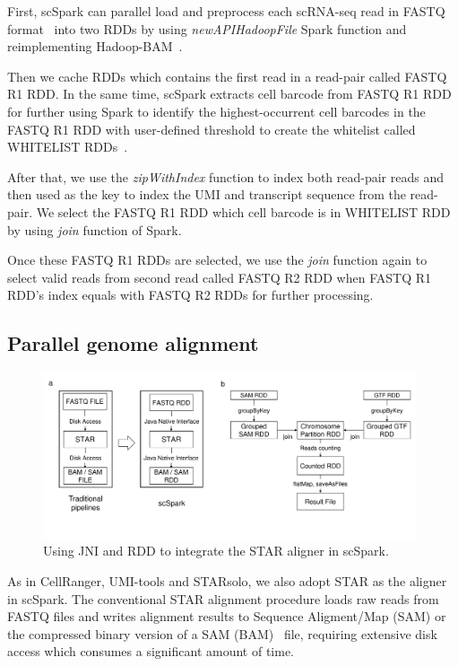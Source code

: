 \documentclass[conference]{IEEEtran}
\begin{document}
First, scSpark can parallel load and preprocess each scRNA-seq read in FASTQ format~\cite{cock2010sanger} into two RDDs by using \textit{newAPIHadoopFile} Spark function and reimplementing Hadoop-BAM~\cite{hadoopBAM}.

Then we cache RDDs which contains the first read in a read-pair called FASTQ R1 RDD.
In the same time, scSpark extracts cell barcode from FASTQ R1 RDD for further using Spark to identify the highest-occurrent cell barcodes in the FASTQ R1 RDD with user-defined threshold to create the whitelist called WHITELIST RDDs~\cite{guo2018bioinformatics}.

After that, we use the \textit{zipWithIndex} function to index both read-pair reads and then used as the key to index the UMI and transcript sequence from the read-pair.
We select the FASTQ R1 RDD which cell barcode is in WHITELIST RDD by using \textit{join} function of Spark.

Once these FASTQ R1 RDDs are selected, we use the \textit{join} function again to select valid reads from second read called FASTQ R2 RDD when FASTQ R1 RDD's index equals with FASTQ R2 RDDs for further processing. 

\subsection{Parallel genome alignment}
\begin{figure}
\centering
	\includegraphics[width=0.98\textwidth]{fig1.pdf}
	\caption{Using JNI and RDD to integrate the STAR aligner in scSpark.} \label{fig1}
\end{figure}

As in CellRanger, UMI-tools and STARsolo, we also adopt STAR as the aligner in scSpark.
The conventional STAR alignment procedure loads raw reads from FASTQ files and writes alignment results to Sequence Aligment/Map (SAM) or the compressed binary version of a SAM (BAM)~\cite{li2009sequence} file, requiring extensive disk access which consumes a significant amount of time.
\end{document}
